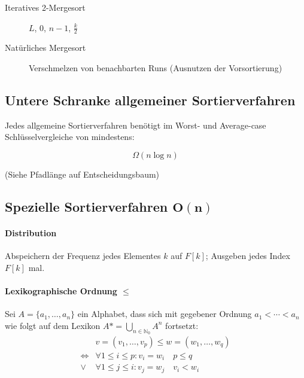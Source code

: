\begin{description}
  \item [Iteratives 2-Mergesort]

        \begin{algorithm}[H]



          \Merge $L$, $0$, $n - 1$, $\frac{k}{2}$
        \end{algorithm}

  \item [Natürliches Mergesort]
        Verschmelzen von benachbarten Runs (Ausnutzen der Vorsortierung)

\end{description}

\subsection{Untere Schranke allgemeiner Sortierverfahren}

Jedes allgemeine Sortierverfahren benötigt im Worst- und Average-case Schlüsselvergleiche von mindestens:

$$\Omega (n \log n)$$

(Siehe Pfadlänge auf Entscheidungsbaum)

\subsection{Spezielle Sortierverfahren $\mathbf{O(n)}$}

\paragraph{Distribution}

Abspeichern der Frequenz jedes Elementes $k$ auf $F[k]$; Ausgeben jedes Index $F[k]$ mal.

\paragraph{Lexikographische Ordnung $\mathbf{\leq}$}
Sei $A = \{ a_1, \dots, a_n \}$ ein Alphabet, dass sich mit gegebener Ordnung $a_1 < \cdots < a_n$ wie folgt auf dem Lexikon $A* = \bigcup_{n \in \mathbb{N}_0} A^n$ fortsetzt:
\begin{align*}
                  & v = (v_1, \dots, v_p) \leq w = (w_1, \dots, w_q)   \\
  \Leftrightarrow & \forall 1 \leq i \leq p: v_i = w_i \quad p \leq q  \\
  \lor            & \forall 1 \leq j \leq i: v_j = w_j \quad v_i < w_i
\end{align*}

